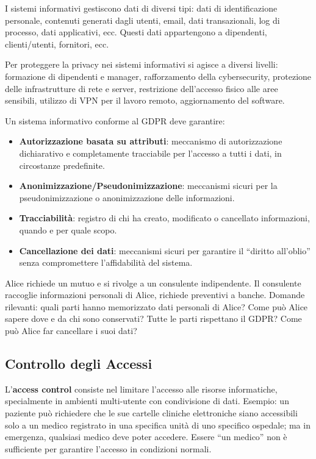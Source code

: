 \documentclass[a4paper,11pt]{article}
\begin{document}
I sistemi informativi gestiscono dati di diversi tipi: dati di identificazione personale, contenuti generati dagli utenti, email, dati transazionali, log di processo, dati applicativi, ecc. Questi dati appartengono a dipendenti, clienti/utenti, fornitori, ecc.

Per proteggere la privacy nei sistemi informativi si agisce a diversi livelli: formazione di dipendenti e manager, rafforzamento della cybersecurity, protezione delle infrastrutture di rete e server, restrizione dell'accesso fisico alle aree sensibili, utilizzo di VPN per il lavoro remoto, aggiornamento del software.

\begin{definizione}
Un sistema informativo conforme al GDPR deve garantire:
\begin{itemize}
  \item \textbf{Autorizzazione basata su attributi}: meccanismo di autorizzazione dichiarativo e completamente tracciabile per l'accesso a tutti i dati, in circostanze predefinite.
  \item \textbf{Anonimizzazione/Pseudonimizzazione}: meccanismi sicuri per la pseudonimizzazione o anonimizzazione delle informazioni.
  \item \textbf{Tracciabilit\`{a}}: registro di chi ha creato, modificato o cancellato informazioni, quando e per quale scopo.
  \item \textbf{Cancellazione dei dati}: meccanismi sicuri per garantire il ``diritto all'oblio'' senza compromettere l'affidabilit\`{a} del sistema.
\end{itemize}
\end{definizione}

\begin{esempio}
Alice richiede un mutuo e si rivolge a un consulente indipendente. Il consulente raccoglie informazioni personali di Alice, richiede preventivi a banche. Domande rilevanti: quali parti hanno memorizzato dati personali di Alice? Come pu\`{o} Alice sapere dove e da chi sono conservati? Tutte le parti rispettano il GDPR? Come pu\`{o} Alice far cancellare i suoi dati?
\end{esempio}

\subsection{Controllo degli Accessi}

\begin{definizione}
L'\textbf{access control} consiste nel limitare l'accesso alle risorse informatiche, specialmente in ambienti multi-utente con condivisione di dati. Esempio: un paziente pu\`{o} richiedere che le sue cartelle cliniche elettroniche siano accessibili solo a un medico registrato in una specifica unit\`{a} di uno specifico ospedale; ma in emergenza, qualsiasi medico deve poter accedere. Essere ``un medico'' non \`{e} sufficiente per garantire l'accesso in condizioni normali.
\end{definizione}
\end{document}
